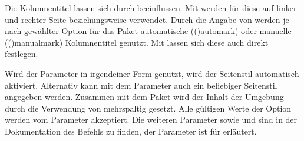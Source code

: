 \begin{DeclareEntity*}{}
\begin{DeclareEntity*}{}
\begin{DeclareEntity*}{}
\begin{Declaration}
\begin{Declaration}
\begin{Declaration}
\begin{Declaration}
\begin{Declaration}
\begin{Declaration}
\begin{Declaration}
\begin{Declaration}
\begin{Declaration}
\begin{Declaration}
\begin{Declaration}
%
%
Die Kolumnentitel lassen sich durch  
beeinflussen. Mit
werden für diese auf linker und rechter Seite  
beziehungsweise  verwendet. Durch die Angabe von
werden je nach gewählter Option für das Paket  
automatische (\Option(){automark}) oder manuelle
(\Option(){manualmark}) Kolumnentitel genutzt. Mit 
lassen sich diese auch direkt festlegen.

Wird der Parameter  in irgendeiner 
Form genutzt, wird der Seitenstil  automatisch aktiviert. 
Alternativ kann mit dem Parameter 
auch ein beliebiger Seitenstil angegeben werden. Zusammen mit dem Paket 
 wird der Inhalt der Umgebung durch die Verwendung von 
 mehrspaltig gesetzt. 
Alle gültigen Werte der Option  werden vom Parameter
 akzeptiert. Die weiteren Parameter 
 sowie 
 und 
 sind in der Dokumentation des Befehls 
 zu finden, der Parameter 
 ist für  erläutert.
\end{Declaration}
\end{Declaration}
\end{Declaration}
\end{Declaration}
\end{Declaration}
\end{Declaration}
\end{Declaration}
\end{Declaration}
\end{Declaration}
\end{Declaration}
\end{Declaration}


\end{DeclareEntity*}
\end{DeclareEntity*}
\end{DeclareEntity*}
